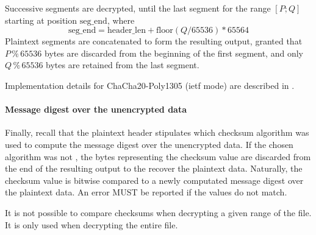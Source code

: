 Successive segments are decrypted, until the last segment for the
range $[P;Q]$ starting at position $\text{seg\_end}$, where
$$\text{seg\_end} = \text{header\_len} + \text{floor}(Q/65536) *
65564$$
%
Plaintext segments are concatenated to form the resulting output,
granted that $P \mathbin{\%} 65536$ bytes are discarded from the
beginning of the first segment, and only $Q \mathbin{\%} 65536$ bytes
are retained from the last segment.

Implementation details for ChaCha20-Poly1305 (ietf mode) are described
in \cite{RFC8439}.

\paragraph{Message digest over the unencrypted data}%
Finally, recall that the plaintext header stipulates which checksum
algorithm was used to compute the message digest over the unencrypted
data. If the chosen algorithm was not , the bytes
representing the checksum value are discarded from the end of the
resulting output to the recover the plaintext data.
% 
Naturally, the checksum value is bitwise compared to a newly
computated message digest over the plaintext data. An error MUST be
reported if the values do not match.

It is not possible to compare checksums when decrypting a given range
of the file. It is only used when decrypting the entire file.

